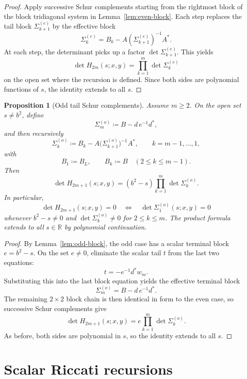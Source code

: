 \documentclass[11pt]{article}
\newtheorem{proposition}[lemma]{Proposition}
\newcommand{\R}{\mathbb R}
\begin{document}
\begin{proof}
Apply successive Schur complements starting from the rightmost block of the
block tridiagonal system in Lemma~\ref{lem:even-block}. Each step replaces the
tail block \(\Sigma_{k+1}^{(e)}\) by the effective block
\[
\Sigma_k^{(e)}=B_k-A(\Sigma_{k+1}^{(e)})^{-1}A^*.
\]
At each step, the determinant picks up a factor \(\det \Sigma_{k+1}^{(e)}\).
This yields
\[
\det H_{2m}(s;x,y)=\prod_{k=1}^m \det \Sigma_k^{(e)}
\]
on the open set where the recursion is defined. Since both sides are polynomial
functions of \(s\), the identity extends to all \(s\).
\end{proof}

\begin{proposition}[Odd tail Schur complements]\label{prop:odd-schur}
Assume \(m\ge 2\). On the open set \(s\neq b^2\), define
\[
\Sigma_m^{(o)}\coloneqq B-d\,e^{-1}d^*,
\]
and then recursively
\[
\Sigma_k^{(o)}\coloneqq B_k-A\bigl(\Sigma_{k+1}^{(o)}\bigr)^{-1}A^*,
\qquad
k=m-1,\dots,1,
\]
with
\[
B_1\coloneqq B_L,
\qquad
B_k\coloneqq B
\quad (2\le k\le m-1).
\]
Then
\[
\det H_{2m+1}(s;x,y)
=
(b^2-s)\prod_{k=1}^m \det \Sigma_k^{(o)}.
\]
In particular,
\[
\det H_{2m+1}(s;x,y)=0
\quad\Longleftrightarrow\quad
\det \Sigma_1^{(o)}(s;x,y)=0
\]
whenever \(b^2-s\neq 0\) and \(\det \Sigma_k^{(o)}\neq 0\) for \(2\le k\le m\).
The product formula extends to all \(s\in\R\) by polynomial continuation.
\end{proposition}

\begin{proof}
By Lemma~\ref{lem:odd-block}, the odd case has a scalar terminal block \(e=b^2-s\).
On the set \(e\neq 0\), eliminate the scalar tail \(t\) from the last two equations:
\[
t=-e^{-1}d^*w_m.
\]
Substituting this into the last block equation yields the effective terminal block
\[
\Sigma_m^{(o)}=B-d\,e^{-1}d^*.
\]
The remaining \(2\times 2\) block chain is then identical in form to the even case,
so successive Schur complements give
\[
\det H_{2m+1}(s;x,y)
=
e\prod_{k=1}^m \det \Sigma_k^{(o)}.
\]
As before, both sides are polynomial in \(s\), so the identity extends to all \(s\).
\end{proof}

\section{Scalar Riccati recursions}
\end{document}
